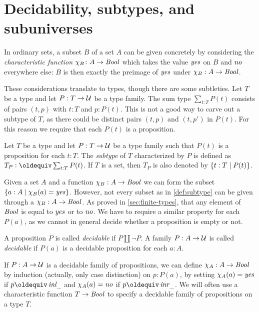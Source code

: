 \section{Decidability, subtypes, and subuniverses}
\label{sec:subtype}

In ordinary sets, a subset $B$ of a set $A$ can be given concretely by 
considering the \emph{characteristic function} $\chi_B\colon A\to\mathop{\mathit{Bool}}$ 
which takes the value $\mathop{\mathit{yes}}$ on $B$ and $\mathop{\mathit{no}}$ everywhere else: 
$B$ is then exactly the preimage of $\mathop{\mathit{yes}}$ under $\chi_B: A\to\mathop{\mathit{Bool}}$.

These considerations translate to types, though there are some 
subtleties. Let $T$ be a type and let $P: T\to\mathcal{U}$ be a type family.
The sum type $\sum_{t:T} P(t)$ consists of pairs $(t,p)$ with
$t:T$ and $p:P(t)$. This is not a good way to carve out a subtype
of $T$, as there could be distinct pairs $(t,p)$ and $(t,p')$ in $P(t)$.
For this reason we require that each $P(t)$ is a proposition.

\begin{definition}\label{def:subtype}
Let $T$ be a type and let $P: T\to\mathcal{U}$ be a type family such that
$P(t)$ is a proposition for each $t:T$. 
The \emph{subtype} of $T$ characterized by $P$ is defined 
as $T_P\defeq \sum_{t:T} P(t)$. If $T$ is a set, then $T_P$
is also denoted by $\{t:T \mid P(t)\}$.
\end{definition}

Given a set $A$ and a function $\chi_B: A\to\mathop{\mathit{Bool}}$ we can form
the subset $\{a:A \mid \chi_B(a) = \mathop{\mathit{yes}}\}$. However,
not every subset as in \cref{def:subtype} can be given
through a $\chi_B: A\to\mathop{\mathit{Bool}}$. As proved in \cref{sec:finite-types},
that any element of $\mathop{\mathit{Bool}}$ is equal to $\mathop{\mathit{yes}}$ or to $\mathop{\mathit{no}}$.
We have to require a similar property for each $P(a)$,
as we cannot in general decide whether a proposition is empty or not.

\begin{definition}\label{def:decidability}
A proposition $P$ is called \emph{decidable} if $P\amalg\neg P$.
A family $P: A\to\mathcal{U}$ is called \emph{decidable} if 
$P(a)$ is a decidable proposition for each $a:A$.
\end{definition}

If $P: A\to\mathcal{U}$ is a decidable family of propositions,
we can define $\chi_A: A\to\mathop{\mathit{Bool}}$ by induction (actually,
only case distinction) on $p:P(a)$, by setting $\chi_A(a)=\mathop{\mathit{yes}}$
if $p\jdeq\inl{\_}$ and $\chi_A(a)=\mathop{\mathit{no}}$ if $p\jdeq\inr{\_}$.
We will often use a characteristic function $T\to\mathop{\mathit{Bool}}$ to
specify a decidable family of propositions on a type $T$.



